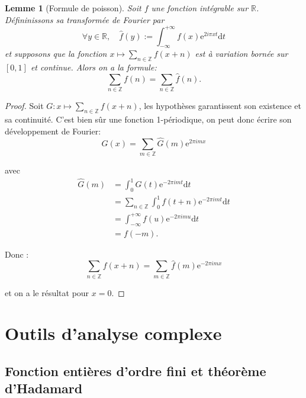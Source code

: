 \documentclass[french]{report}
\newtheorem{lemma}[theorem]{Lemme}
\begin{document}
\begin{lemma}[Formule de poisson]\label{lem:formule-poisson}
  Soit $f$ une fonction intégrable sur $\mathbb{R}$. Défininissons sa transformée de Fourier par
  \[
    \forall y\in\mathbb{R},\quad\hat{f}(y):=\int_{-\infty}^{+\infty}f(x)\mathrm{e}^{2i\pi xt}\mathrm{d}t
  \]
  et supposons que la fonction $x\mapsto\sum_{n\in\mathbb{Z}}f(x+n)$ est à variation bornée sur $[0,1]$ et continue. Alors on a la formule:
  \[
    \sum_{n\in\mathbb{Z}}f(n)=\sum_{n\in\mathbb{Z}}\hat{f}(n).
  \]
\end{lemma}

\begin{proof}
  Soit $G:x\mapsto\sum_{n\in\mathbb{Z}}f(x+n)$, les hypothèses garantissent son existence et sa continuité. C'est bien sûr une fonction 1-périodique, on peut donc écrire son développement de Fourier:
  \[
    G(x)
    =\sum_{m\in\mathbb{Z}}\hat{G}(m)\mathrm{e}^{2\pi imx}
  \]

  avec
  \begin{align*}
    \hat{G}(m)
    &= \int_0^1 G(t)\mathrm{e}^{-2\pi imt}\mathrm{d}t \\
    &= \sum_{n\in\mathbb{Z}}\int_0^1 f(t+n)\mathrm{e}^{-2\pi imt}\mathrm{d}t \\
    &= \int_{-\infty}^{+\infty} f(u)\mathrm{e}^{-2\pi imu}\mathrm{d}t \\
    &= f(-m).
  \end{align*}

  Donc :
  \[
    \sum_{n\in\mathbb{Z}}f(x+n) = \sum_{m\in\mathbb{Z}}\hat{f}(m)\mathrm{e}^{-2\pi imx}
  \]

  et on a le résultat pour $x=0$.
\end{proof}

\section{Outils d'analyse complexe}

\subsection{Fonction entières d'ordre fini et théorème d'Hadamard}
\end{document}
